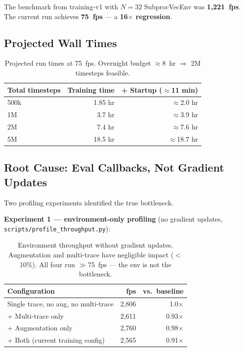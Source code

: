 \documentclass[11pt]{article}
\begin{document}
The benchmark from training-v1 with $N=32$ SubprocVecEnv was
\textbf{1,221~fps}. The current run achieves \textbf{75~fps} --- a
\textbf{16$\times$ regression}.

\subsection{Projected Wall Times}

\begin{table}[h]
\centering
\begin{tabular}{lrr}
\toprule
Total timesteps & Training time & + Startup ($\approx$11 min) \\
\midrule
500k   & 1.85 hr & $\approx$2.0 hr \\
1M     & 3.7 hr  & $\approx$3.9 hr \\
2M     & 7.4 hr  & $\approx$7.6 hr \\
5M     & 18.5 hr & $\approx$18.7 hr \\
\bottomrule
\end{tabular}
\caption{Projected run times at 75~fps. Overnight budget $\approx$8~hr
$\Rightarrow$ 2M timesteps feasible.}
\end{table}

\subsection{Root Cause: Eval Callbacks, Not Gradient Updates}
\label{sec:rootcause}

Two profiling experiments identified the true bottleneck.

\textbf{Experiment 1 — environment-only profiling} (no gradient updates,
\texttt{scripts/profile\_throughput.py}):

\begin{table}[h]
\centering
\begin{tabular}{lrr}
\toprule
Configuration & fps & vs.\ baseline \\
\midrule
Single trace, no aug, no multi-trace & 2,806 & 1.0$\times$ \\
+ Multi-trace only                    & 2,611 & 0.93$\times$ \\
+ Augmentation only                   & 2,760 & 0.98$\times$ \\
+ Both (current training config)      & 2,565 & 0.91$\times$ \\
\bottomrule
\end{tabular}
\caption{Environment throughput without gradient updates.
Augmentation and multi-trace have negligible impact ($<$10\%).
All four run $\gg$75~fps — the env is not the bottleneck.}
\end{table}
\end{document}
